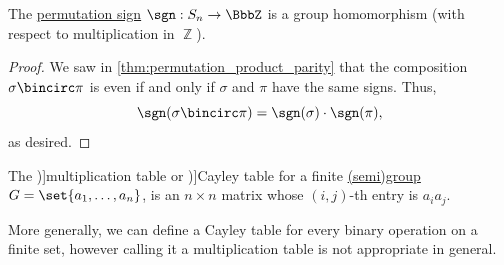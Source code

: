 \begin{proposition}\label{thm:permutation_sign_homomorphism}
  The \hyperref[def:permutation_parity]{permutation sign} \( \sgn: S_n \to \BbbZ \) is a group homomorphism (with respect to multiplication in \( \BbbZ \)).
\end{proposition}
\begin{proof}
  We saw in \cref{thm:permutation_product_parity} that the composition \( \sigma \bincirc \pi \) is even if and only if \( \sigma \) and \( \pi \) have the same signs. Thus,
  \begin{equation*}
    \sgn(\sigma \bincirc \pi) = \sgn(\sigma) \cdot \sgn(\pi),
  \end{equation*}
  as desired.
\end{proof}

\begin{definition}\label{def:cayley_table}
  The \term[ru=таблица умножения (\cite[135]{Шафаревич2019ОсновныеПонятияАлгебры})]{multiplication table} or \term[ru=таблица Кэли (\cite[135]{Шафаревич2019ОсновныеПонятияАлгебры})]{Cayley table} for a finite \hyperref[def:semigroup]{(semi)group} \( G = \set{ a_1, \ldots, a_n } \), is an \( n \times n \) matrix whose \( (i, j) \)-th entry is \( a_i a_j \).

  More generally, we can define a Cayley table for every binary operation on a finite set, however calling it a multiplication table is not appropriate in general.
\end{definition}

